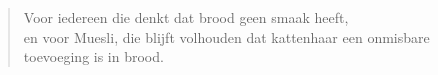  \thispagestyle{empty}
 \newenvironment{dedication}
     {\vspace{6ex}\begin{quotation}\begin{center}\begin{em}}
     {\par\end{em}\end{center}\end{quotation}}

\begin{dedication}
	Voor iedereen die denkt dat brood geen smaak heeft, \\
	en voor Muesli, die blijft volhouden dat kattenhaar een onmisbare toevoeging is in brood. 
\end{dedication}
